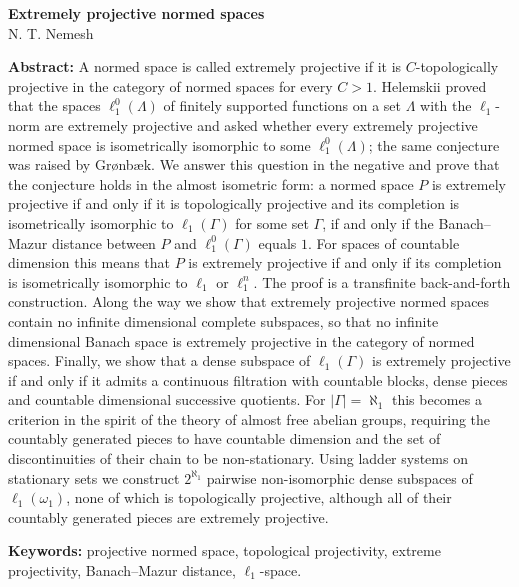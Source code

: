 \documentclass[12pt]{article}
\newcommand{\lo}[1]{\ell_1^0(#1)}
\newcommand{\ellone}[1]{\ell_1(#1)}
\begin{document}
\begin{center}
    \Large \textbf{Extremely projective normed spaces}\\[0.5cm]
    \small {N. T. Nemesh}\\[0.5cm]
\end{center}

\thispagestyle{empty}

\medskip
\textbf{Abstract:} A normed space is called extremely projective if it is
$C$-topologically projective in the category of normed spaces for every $C>1$.
Helemskii proved that the spaces $\lo{\Lambda}$ of finitely supported functions
on a set $\Lambda$ with the $\ell_1$-norm are extremely projective and asked
whether every extremely projective normed space is isometrically isomorphic to
some $\lo{\Lambda}$; the same conjecture was raised by Gr{\o}nb{\ae}k. We answer
this question in the negative and prove that the conjecture holds in the
almost isometric form: a normed space $P$ is extremely projective if and only
if it is topologically projective and its completion is isometrically
isomorphic to $\ellone{\Gamma}$ for some set $\Gamma$, if and only if the
Banach--Mazur distance between $P$ and $\lo{\Gamma}$ equals $1$. For spaces of
countable dimension this means that $P$ is extremely projective if and only
if its completion is isometrically isomorphic to $\ell_1$ or $\ell_1^n$. The
proof is a transfinite back-and-forth construction. Along the way we show that
extremely projective normed spaces contain no infinite dimensional complete
subspaces, so that no infinite dimensional Banach space is extremely
projective in the category of normed spaces. Finally, we show that a dense
subspace of $\ellone{\Gamma}$ is extremely projective if and only if it
admits a continuous filtration with countable blocks, dense pieces and
countable dimensional successive quotients. For $|\Gamma|=\aleph_1$ this
becomes a criterion in the spirit of the theory of almost free abelian
groups, requiring the countably generated pieces to have countable dimension
and the set of discontinuities of their chain to be non-stationary. Using
ladder systems on stationary sets we construct $2^{\aleph_1}$ pairwise
non-isomorphic dense subspaces of $\ellone{\omega_1}$, none of which is
topologically projective, although all of their countably generated pieces
are extremely projective.
\medskip

\textbf{Keywords:} projective normed space, topological projectivity, extreme
projectivity, Banach--Mazur distance, $\ell_1$-space.
\end{document}
